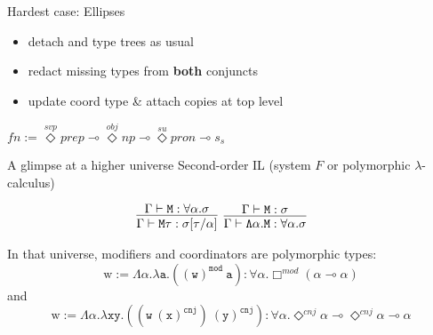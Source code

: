 \documentclass{beamer}
\newcommand{\term}[1]{\ensuremath{\mathtt{#1}}}
\newcommand{\li}{\!\multimap\!}
\begin{document}
\begin{frame}{Hardest case: Ellipses}
	\begin{minipage}{0.58\textwidth}
	\scriptsize
	\begin{itemize}
	\item 	detach and type trees as usual
	\item 	redact missing types from \textbf{both} conjuncts
	\item update coord type \& attach copies at top level
	\end{itemize}
	\end{minipage}%
	\begin{minipage}{0.42\textwidth}
	\scriptsize
	\begin{flushright}
		$fn := \overset{svp}{\Diamond}prep \li \overset{obj}{\Diamond}{np}\li \overset{su}{\Diamond}pron \li s_s$
	\end{flushright}
	\end{minipage}
\end{frame}

\begin{frame}{A glimpse at a higher universe}
\small
	Second-order IL (system $F$ or polymorphic $\lambda$-calculus)
	
	\begin{align*}
		\infer[]{\Gamma \vdash \term{M\tau}: \sigma[\tau/ \alpha]}{\Gamma \vdash \term{M}: \forall \alpha.\sigma}
		&
		\infer[]{\Gamma \vdash \term{\Lambda \alpha.M}: \forall \alpha.\sigma}{\Gamma \vdash \term{M}: \sigma}
	\end{align*}
	
	\pause
	In that universe, modifiers and coordinators are polymorphic types:
	\[
		\text{w} := \term{\Lambda \alpha.\lambda a.(({w})^{mod}\ a )} :\forall \alpha.\Box^{mod}\left(\alpha \li \alpha\right)
	\]
	and
	\[
		\text{w} := \term{\Lambda \alpha.\lambda xy.((\term{w}\ (x)^{cnj})\ (y)^{cnj})} : \forall \alpha.\Diamond^{cnj}\alpha \li \Diamond^{cnj}\alpha \li \alpha
	\]
\end{frame}
\end{document}
